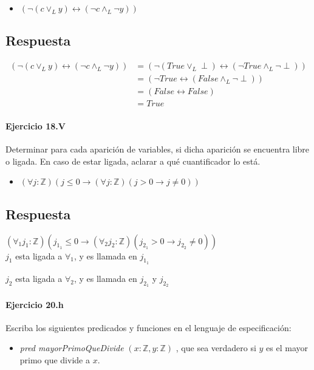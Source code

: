 \documentclass[a4paper]{article}
\begin{document}
\begin{itemize}
\item $ (\neg (c\vee _L y)\leftrightarrow (\neg c \wedge _L \neg y)) $
\end{itemize}


\subsection*{Respuesta}
\begin{align*}
  (\neg (c\vee _L y)\leftrightarrow (\neg c \wedge _L \neg y)) &= (\neg (True\vee _L \perp)\leftrightarrow (\neg True \wedge _L \neg \perp))\\
  &= (\neg True\leftrightarrow (False \wedge _L \neg \perp))\\
  &= (False\leftrightarrow False)\\
  &= True
\end{align*}



\paragraph{\textbf{Ejercicio 18.V}} Determinar para cada aparición de variables, si dicha aparición se encuentra libre o ligada. En caso de estar ligada, aclarar a qué cuantificador lo está.
\begin{itemize}
\item $ ( \forall j:\mathbb{Z})(j \leq 0 \rightarrow ( \forall j:\mathbb{Z})(j>0 \rightarrow j \neq 0))$
\end{itemize}


\subsection*{Respuesta}

$ ( \forall _1 j_{1}:\mathbb{Z})(j_{1_1} \leq 0 \rightarrow ( \forall _2 j_2:\mathbb{Z})(j_{2_1}>0 \rightarrow j_{2_2} \neq 0))$\\

$ j_1$ esta ligada a $\forall _1$, y es llamada en $j_{1_1}$

$ j_2$ esta ligada a $\forall _2$, y es llamada en $j_{2_1}$ y $j_{2_2}$



\paragraph{\textbf{Ejercicio 20.h}}  Escriba los siguientes predicados y funciones en el lenguaje de especificación:
\begin{itemize}
\item \textit{pred mayorPrimoQueDivide} $(x: \mathbb{Z},y: \mathbb{Z})$ , que sea verdadero si $y$ es el mayor primo que divide a $x$.
\end{itemize}
\end{document}
